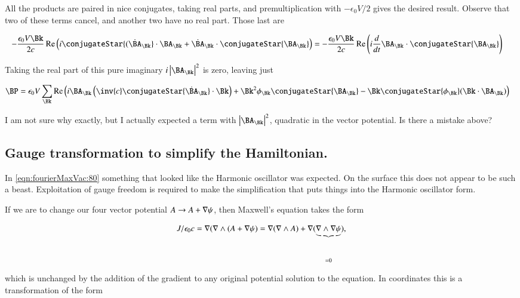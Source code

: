 All the products are paired in nice conjugates, taking real parts, and premultiplication with $-\epsilon_0 V/2$ gives the desired result.  Observe that two of these terms cancel, and another two have no real part.  Those last are

\begin{align*}
-\frac{\epsilon_0 V \Bk}{2 c} \Real \left( i 
\conjugateStar{(\dot{\BA}_\Bk} \cdot \BA_\Bk
+
\dot{\BA}_\Bk \cdot \conjugateStar{\BA_\Bk} 
\right)
&=
-\frac{\epsilon_0 V \Bk}{2 c} \Real \left( i \frac{d}{dt} \BA_\Bk \cdot \conjugateStar{\BA_\Bk} \right)
\end{align*}

Taking the real part of this pure imaginary $i \Abs{\BA_\Bk}^2$ is zero, leaving just

\begin{align}\label{eqn:fourierMaxVac:100}
\BP &= \epsilon_0 V \sum_{\Bk}
\Real \left(
i \BA_\Bk \left( \inv{c} \conjugateStar{\dot{\BA}_\Bk} \cdot \Bk \right)
+ 
\Bk^2 \phi_\Bk \conjugateStar{ \BA_\Bk }
- \Bk \conjugateStar{\phi_\Bk} (\Bk \cdot \BA_\Bk)
\right)
\end{align}

I am not sure why exactly, but I actually expected a term with $\Abs{\BA_\Bk}^2$, quadratic in the vector potential.  Is there a mistake above?

\subsection{Gauge transformation to simplify the Hamiltonian.}

In \autoref{eqn:fourierMaxVac:80} something that looked like the Harmonic oscillator was expected.  On the surface this does not appear to be such a beast.  Exploitation of gauge freedom is required to make the simplification that puts things into the Harmonic oscillator form.

If we are to change our four vector potential $A \rightarrow A + \nabla \psi$, then Maxwell's equation takes the form

\begin{align}\label{eqn:fourierMaxVac:30}
J/\epsilon_0 c = \nabla (\nabla \wedge (A + \nabla \psi) = \nabla (\nabla \wedge A) + \nabla (\underbrace{\nabla \wedge \nabla \psi}_{=0}),
\end{align}

which is unchanged by the addition of the gradient to any original potential solution to the equation.  In coordinates this is a transformation of the form


